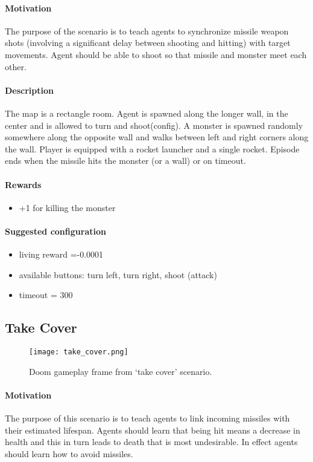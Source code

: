 		\paragraph{Motivation} 
			The purpose of the scenario is to teach agents to synchronize missile weapon shots (involving a significant delay between shooting and hitting) with target movements. Agent should be able to shoot so that missile and monster meet each other.

		\paragraph{Description}
			The map is a rectangle room. Agent is spawned along the longer wall, in the center and is allowed to turn and shoot(config). A monster is spawned randomly somewhere along the opposite wall and walks between left and right corners along the wall. Player is equipped with a rocket launcher and a single rocket. Episode ends when the missile hits the monster (or a wall) or on timeout.
		\paragraph{Rewards}
		\begin{itemize}
			\item +1 for killing the monster
		\end{itemize}
		
		\paragraph{Suggested configuration}
		\begin{itemize}
			\item living reward =-0.0001
			\item available buttons: turn left, turn right, shoot (attack)
			\item timeout = 300
		\end{itemize}
	\newpage

	\subsection{Take Cover}
		\begin{figure}
			\centering
			\texttt{[image: take\_cover.png]}
			\caption{Doom gameplay frame from `take cover' scenario.}
		\end{figure}
		\paragraph{Motivation} 
			The purpose of this scenario is to teach agents to link incoming missiles with their estimated lifespan. Agents should learn that being hit means a decrease in health and this in turn leads to death that is most undesirable. In effect agents should learn how to avoid missiles.

